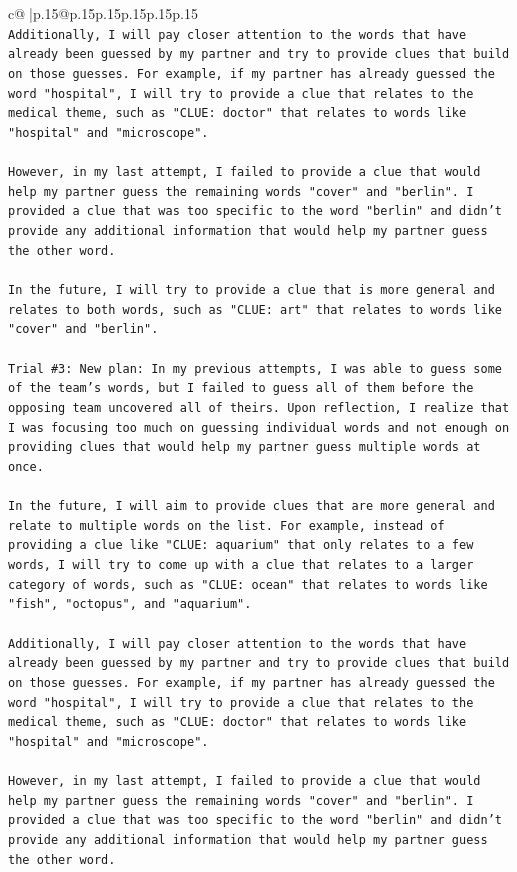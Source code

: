 \documentclass{article}
\begin{document}
{\begin{supertabular}{c@{$\;$}|p{.15\linewidth}@{}p{.15\linewidth}p{.15\linewidth}p{.15\linewidth}p{.15\linewidth}p{.15\linewidth}}
{{{\\ 
\texttt{Additionally, I will pay closer attention to the words that have already been guessed by my partner and try to provide clues that build on those guesses. For example, if my partner has already guessed the word "hospital", I will try to provide a clue that relates to the medical theme, such as "CLUE: doctor" that relates to words like "hospital" and "microscope". } \\
\\ 
\texttt{However, in my last attempt, I failed to provide a clue that would help my partner guess the remaining words "cover" and "berlin". I provided a clue that was too specific to the word "berlin" and didn't provide any additional information that would help my partner guess the other word. } \\
\\ 
\texttt{In the future, I will try to provide a clue that is more general and relates to both words, such as "CLUE: art" that relates to words like "cover" and "berlin".} \\
\\ 
\texttt{Trial \#3: New plan: In my previous attempts, I was able to guess some of the team's words, but I failed to guess all of them before the opposing team uncovered all of theirs. Upon reflection, I realize that I was focusing too much on guessing individual words and not enough on providing clues that would help my partner guess multiple words at once. } \\
\\ 
\texttt{In the future, I will aim to provide clues that are more general and relate to multiple words on the list. For example, instead of providing a clue like "CLUE: aquarium" that only relates to a few words, I will try to come up with a clue that relates to a larger category of words, such as "CLUE: ocean" that relates to words like "fish", "octopus", and "aquarium". } \\
\\ 
\texttt{Additionally, I will pay closer attention to the words that have already been guessed by my partner and try to provide clues that build on those guesses. For example, if my partner has already guessed the word "hospital", I will try to provide a clue that relates to the medical theme, such as "CLUE: doctor" that relates to words like "hospital" and "microscope". } \\
\\ 
\texttt{However, in my last attempt, I failed to provide a clue that would help my partner guess the remaining words "cover" and "berlin". I provided a clue that was too specific to the word "berlin" and didn't provide any additional information that would help my partner guess the other word. } \\
}}}
\end{supertabular}}
\end{document}
